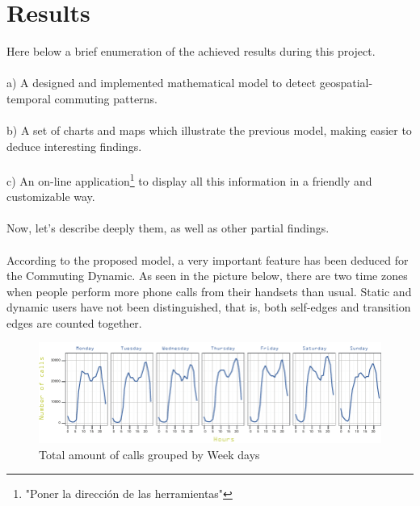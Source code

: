 \newpage
\section{Results}
\label{sec:results}

Here below a brief enumeration of the achieved results during this project.
\\
\\
a) A designed and implemented mathematical model to detect geospatial-temporal commuting patterns.
\\
\\
b) A set of charts and maps which illustrate the previous model, making easier to deduce interesting findings.
\\
\\
c) An on-line application\footnote{"Poner la dirección de las herramientas"} to display all this information in a friendly and customizable way.
\\
\\
Now, let's describe deeply them, as well as other partial findings.
\\
\\
According to the proposed model, a very important feature has been deduced for the Commuting Dynamic. As seen in the picture below, there are two time zones when people perform more phone calls from their handsets than usual. Static and dynamic users have not been distinguished, that is, both self-edges and transition edges are counted together.

\begin{figure}[h]
\begin{center}
\includegraphics[scale =1.1] {results/images/calls_number.pdf}
\caption{Total amount of calls grouped by Week days}
\label{fig:count_calls}
\end{center}
\end{figure}


